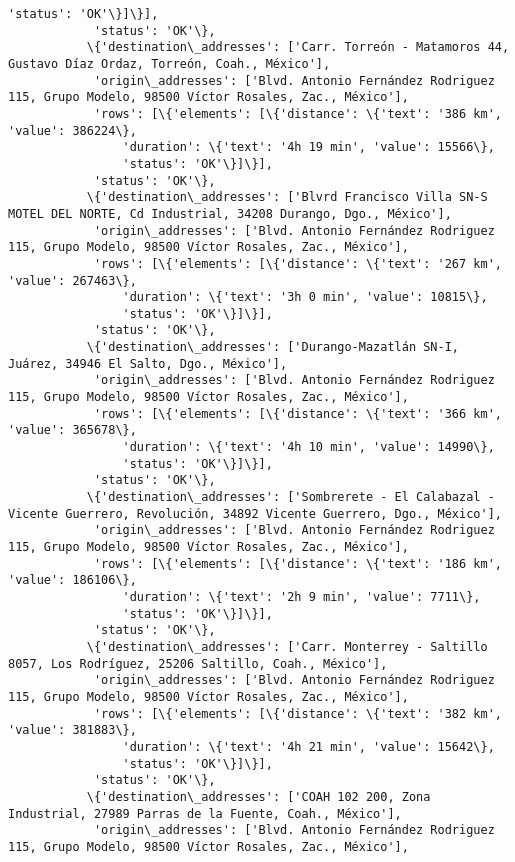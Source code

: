 \documentclass[11pt]{article}
\begin{document}
\begin{Verbatim}[commandchars=\\\{\}]
                'status': 'OK'\}]\}],
            'status': 'OK'\},
           \{'destination\_addresses': ['Carr. Torreón - Matamoros 44, Gustavo Díaz Ordaz, Torreón, Coah., México'],
            'origin\_addresses': ['Blvd. Antonio Fernández Rodriguez 115, Grupo Modelo, 98500 Víctor Rosales, Zac., México'],
            'rows': [\{'elements': [\{'distance': \{'text': '386 km', 'value': 386224\},
                'duration': \{'text': '4h 19 min', 'value': 15566\},
                'status': 'OK'\}]\}],
            'status': 'OK'\},
           \{'destination\_addresses': ['Blvrd Francisco Villa SN-S MOTEL DEL NORTE, Cd Industrial, 34208 Durango, Dgo., México'],
            'origin\_addresses': ['Blvd. Antonio Fernández Rodriguez 115, Grupo Modelo, 98500 Víctor Rosales, Zac., México'],
            'rows': [\{'elements': [\{'distance': \{'text': '267 km', 'value': 267463\},
                'duration': \{'text': '3h 0 min', 'value': 10815\},
                'status': 'OK'\}]\}],
            'status': 'OK'\},
           \{'destination\_addresses': ['Durango-Mazatlán SN-I, Juárez, 34946 El Salto, Dgo., México'],
            'origin\_addresses': ['Blvd. Antonio Fernández Rodriguez 115, Grupo Modelo, 98500 Víctor Rosales, Zac., México'],
            'rows': [\{'elements': [\{'distance': \{'text': '366 km', 'value': 365678\},
                'duration': \{'text': '4h 10 min', 'value': 14990\},
                'status': 'OK'\}]\}],
            'status': 'OK'\},
           \{'destination\_addresses': ['Sombrerete - El Calabazal - Vicente Guerrero, Revolución, 34892 Vicente Guerrero, Dgo., México'],
            'origin\_addresses': ['Blvd. Antonio Fernández Rodriguez 115, Grupo Modelo, 98500 Víctor Rosales, Zac., México'],
            'rows': [\{'elements': [\{'distance': \{'text': '186 km', 'value': 186106\},
                'duration': \{'text': '2h 9 min', 'value': 7711\},
                'status': 'OK'\}]\}],
            'status': 'OK'\},
           \{'destination\_addresses': ['Carr. Monterrey - Saltillo 8057, Los Rodríguez, 25206 Saltillo, Coah., México'],
            'origin\_addresses': ['Blvd. Antonio Fernández Rodriguez 115, Grupo Modelo, 98500 Víctor Rosales, Zac., México'],
            'rows': [\{'elements': [\{'distance': \{'text': '382 km', 'value': 381883\},
                'duration': \{'text': '4h 21 min', 'value': 15642\},
                'status': 'OK'\}]\}],
            'status': 'OK'\},
           \{'destination\_addresses': ['COAH 102 200, Zona Industrial, 27989 Parras de la Fuente, Coah., México'],
            'origin\_addresses': ['Blvd. Antonio Fernández Rodriguez 115, Grupo Modelo, 98500 Víctor Rosales, Zac., México'],

\end{Verbatim}
\end{document}
